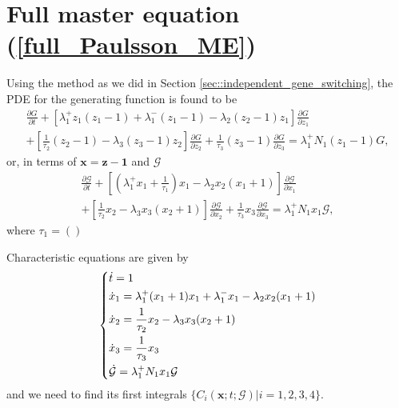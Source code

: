 \documentclass[a4paper, 11pt]{article}
\begin{document}
\section{Full master equation (\ref{full_Paulsson_ME})}
Using the method as we did in Section \ref{sec::independent_gene_switching}, the PDE for the generating function is found to be
\begin{equation*} \label{full_Paulsson_PDE}
  \begin{split}
    \frac{\partial G}{\partial t} + \left[\lambda_1^+z_1(z_1-1) + \lambda_1^-(z_1-1) - \lambda_2(z_2-1)z_1\right]\frac{\partial G}{\partial z_1}\\ + \left[\frac{1}{\tau_2}(z_2-1) - \lambda_3(z_3-1)z_2\right]\frac{\partial G}{\partial z_2} + \frac{1}{\tau_3}(z_3-1)\frac{\partial G}{\partial z_3} = \lambda_1^+N_1(z_1-1)G,
  \end{split}
\end{equation*}
or, in terms of $\mathbf x = \mathbf z - \mathbf 1$ and $\mathcal G$
\begin{equation} \label{full_Paulsson_PDE_x}
  \begin{split}
    \frac{\partial \mathcal G}{\partial t} + \left[(\lambda_1^+x_1+\frac{1}{\tau_1})x_1  - \lambda_2x_2(x_1+1)\right]\frac{\partial \mathcal G}{\partial x_1}\\ + \left[\frac{1}{\tau_2}x_2 - \lambda_3x_3(x_2+1)\right]\frac{\partial \mathcal G}{\partial x_2} + \frac{1}{\tau_3}x_3\frac{\partial \mathcal G}{\partial x_3} = \lambda_1^+N_1x_1\mathcal G,
  \end{split}
\end{equation}
where $\tau_1 = ()$

Characteristic equations are given by
\begin{equation} \label{full_characteristics}
  \begin{dcases}
    \dot t = 1\\
    \dot x_1 = \lambda_1^+(x_1+1)x_1 + \lambda_1^-x_1 - \lambda_2x_2(x_1+1)\\
    \dot x_2 = \frac{1}{\tau_2}x_2 - \lambda_3x_3(x_2+1)\\
    \dot x_3 = \frac{1}{\tau_3}x_3\\
    \dot {\mathcal G} = \lambda_1^+N_1x_1\mathcal G
  \end{dcases}
\end{equation}
and we need to find its first integrals $\{C_i(\mathbf x; t; \mathcal G)|i=1,2,3,4\}$.
\end{document}
